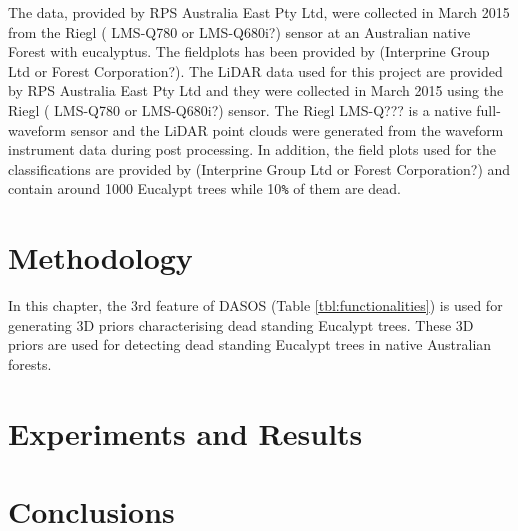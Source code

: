 \documentclass{subfiles}
\begin{document}
\par The data, provided by RPS Australia East Pty Ltd, were collected in March 2015 from the Riegl ( LMS-Q780 or LMS-Q680i?) sensor at an Australian native Forest with eucalyptus. The fieldplots has been provided by (Interprine Group Ltd or Forest Corporation?). 
The LiDAR data used for this project are provided by RPS Australia East Pty Ltd and they were collected in March 2015 using the Riegl ( LMS-Q780 or LMS-Q680i?) sensor. The Riegl LMS-Q??? is a native full-waveform sensor and the LiDAR point clouds were generated from the waveform instrument data during post processing. In addition, the field plots used for the classifications are provided by (Interprine Group Ltd or Forest Corporation?) and contain around 1000 Eucalypt trees while 10\verb|%| of them are dead. 

\section{Methodology}

\par In this chapter, the 3rd feature of DASOS (Table \ref{tbl:functionalities}) is used for generating 3D priors characterising dead standing Eucalypt trees. These 3D priors are used for detecting dead standing Eucalypt trees in native Australian forests. 

\section{Experiments and Results}

\section{Conclusions}
\end{document}
